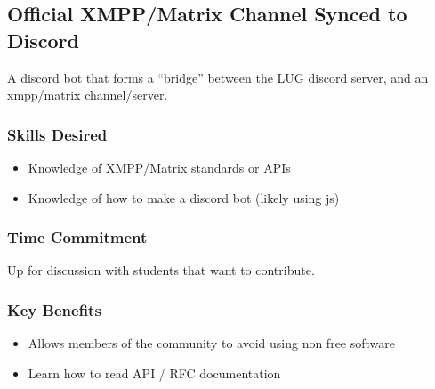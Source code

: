 \subsection{Official XMPP/Matrix Channel Synced to Discord}

A discord bot that forms a ``bridge'' between the LUG discord server, and an xmpp/matrix channel/server.

\subsubsection*{Skills Desired}

\begin{itemize}
\item Knowledge of XMPP/Matrix standards or APIs
\item Knowledge of how to make a discord bot (likely using js)
\end{itemize}

\subsubsection*{Time Commitment}

Up for discussion with students that want to contribute.

\subsubsection*{Key Benefits}

\begin{itemize}
\item Allows members of the community to avoid using non free software
\item Learn how to read API / RFC documentation
\end{itemize}
